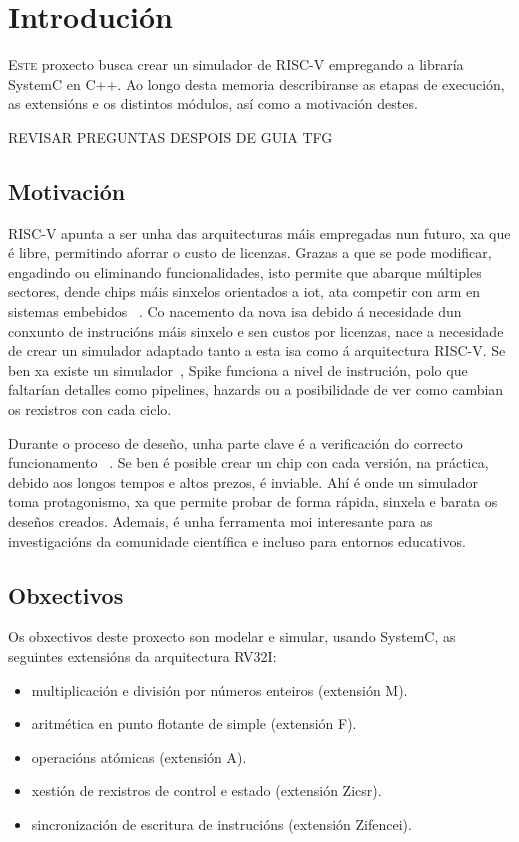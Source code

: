 \chapter{Introdución}
\label{chap:introducion}

\lettrine{E}{ste} proxecto busca crear un simulador de RISC-V empregando a libraría SystemC en C++. Ao longo desta memoria describiranse as etapas de execución, as extensións e os distintos módulos, así como a motivación destes.

 REVISAR PREGUNTAS DESPOIS DE GUIA TFG

\section{Motivación}
\label{sec:motivación}
RISC-V apunta a ser unha das arquitecturas máis empregadas nun futuro, xa que é libre, permitindo aforrar o custo de licenzas. Grazas a que se pode modificar, engadindo ou eliminando funcionalidades, isto permite que abarque múltiples sectores, dende \gls{chips} máis sinxelos orientados a \acrfull{iot}, ata competir con \acrfull{arm} en sistemas embebidos ~\cite{RISCV_IoT,RISCV_vsARM}. Co nacemento da nova \acrfull{isa} debido á necesidade dun conxunto de instrucións máis sinxelo e sen custos por licenzas, nace a necesidade de crear un simulador adaptado tanto a esta \acrshort{isa} como á arquitectura RISC-V. Se ben xa existe un simulador~\cite{sim_spike}, Spike funciona a nivel de instrución, polo que faltarían detalles como pipelines, \gls{hazards} ou a posibilidade de ver como cambian os rexistros con cada ciclo.

Durante o proceso de deseño, unha parte clave é a verificación do correcto funcionamento ~\cite{ChipVerify_verification,RISCV_verification}. Se ben é posible crear un chip con cada versión, na práctica, debido aos longos tempos e altos prezos, é inviable. Ahí é onde un simulador toma protagonismo, xa que permite probar de forma rápida, sinxela e barata os deseños creados. Ademais, é unha ferramenta moi interesante para as investigacións da comunidade científica e incluso para entornos educativos.

\section{Obxectivos}
\label{sec:obxectivos}
Os obxectivos deste proxecto son modelar e simular, usando SystemC, as seguintes extensións da arquitectura RV32I: 

\begin{itemize}
    \item multiplicación e división por números enteiros (extensión M).
    \item aritmética en punto flotante de simple (extensión F).
    \item operacións atómicas  (extensión A).
    \item xestión de rexistros de control e estado (extensión Zicsr).
    \item sincronización de escritura de instrucións (extensión Zifencei).
\end{itemize}


